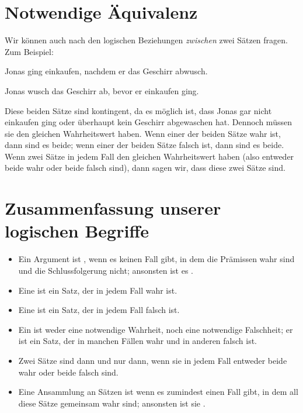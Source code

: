 \section{Notwendige Äquivalenz}

Wir können auch nach den logischen Beziehungen \emph{zwischen} zwei Sätzen fragen. Zum Beispiel:
\begin{earg}
\item[] Jonas ging einkaufen, nachdem er das Geschirr abwusch.
\item[] Jonas wusch das Geschirr ab, bevor er einkaufen ging.
\end{earg}
Diese beiden Sätze sind kontingent, da es möglich ist, dass Jonas gar nicht einkaufen ging oder überhaupt kein Geschirr abgewaschen hat. Dennoch müssen sie den gleichen Wahrheitswert haben. Wenn einer der beiden Sätze wahr ist, dann sind es beide; wenn einer der beiden Sätze falsch ist, dann sind es beide. Wenn zwei Sätze in jedem Fall den gleichen Wahrheitswert haben (also entweder beide wahr oder beide falsch sind), dann sagen wir, dass diese zwei Sätze  sind.



\section*{Zusammenfassung unserer logischen Begriffe}

\begin{itemize}
\item Ein Argument ist , wenn es keinen Fall gibt, in dem die Prämissen wahr sind und die Schlussfolgerung nicht; ansonsten ist es .

\item Eine  ist ein Satz, der in jedem Fall wahr ist.

\item Eine  ist ein Satz, der in jedem Fall falsch ist.

\item Ein  ist weder eine notwendige Wahrheit, noch eine notwendige Falschheit; er ist ein Satz, der in manchen Fällen wahr und in anderen falsch ist.

\item Zwei Sätze sind  dann und nur dann, wenn sie in jedem Fall entweder beide wahr oder beide falsch sind.

\item Eine Ansammlung an Sätzen ist  wenn es zumindest einen Fall gibt, in dem all diese Sätze gemeinsam wahr sind; ansonsten ist sie .
\end{itemize}


